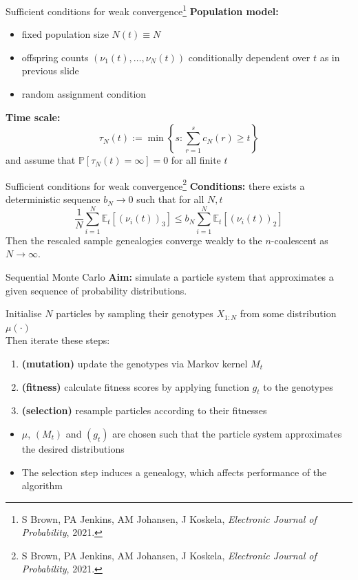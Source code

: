 \documentclass[aspectratio=169,fleqn]{beamer}
\theoremstyle{definition}
\newcommand{\Prob}{\mathbb{P}}
\newcommand{\Et}{\mathbb{E}_{t}}
\begin{document}
\begin{frame}{Sufficient conditions for weak convergence\footnote[frame]{S Brown, PA Jenkins, AM Johansen, J Koskela, \textit{Electronic Journal of Probability}, 2021.}}
	\textbf{Population model:}
	\begin{itemize}
		\item fixed population size $N(t) \equiv N$
		\item offspring counts $(\nu_1(t), \dots, \nu_N(t))$ conditionally dependent over $t$ as in previous slide
		\item random assignment condition
	\end{itemize}
	\textbf{Time scale:}
	\begin{equation*}
	\tau_N(t) := \min \left\{ s: \sum_{r=1}^s c_N(r) \geq t \right\}
	\end{equation*}
	and assume that $\Prob[\tau_N(t) = \infty] =0$ for all finite $t$ 
\end{frame}
\addtocounter{footnote}{-1}
\begin{frame}{Sufficient conditions for weak convergence\footnote[frame]{S Brown, PA Jenkins, AM Johansen, J Koskela, \textit{Electronic Journal of Probability}, 2021.}}
	\textbf{Conditions:} there exists a deterministic sequence $b_N \to 0$ such that for all $N,t$
	\begin{equation*}
	\frac{1}{N} \sum_{i=1}^N \Et[ (\nu_i(t))_3 ] \leq b_N  \sum_{i=1}^N \Et[ (\nu_i(t))_2 ]
	\end{equation*}
	Then the rescaled sample genealogies converge weakly to the $n$-coalescent as $N\to\infty$.
\end{frame}


\begin{frame}{Sequential Monte Carlo}
	\textbf{Aim:} simulate a particle system that approximates a given sequence of probability distributions.\\
	\vspace{10pt}
	
	Initialise $N$ particles by sampling their genotypes $X_{1:N}$ from some distribution $\mu(\cdot)$\\[5pt]
	
	Then iterate these steps:
	\begin{enumerate}
	\item \textbf{(mutation)} update the genotypes via Markov kernel $M_t$
	\item \textbf{(fitness)} calculate fitness scores by applying function $g_t$ to the genotypes
	\item \textbf{(selection)} resample particles according to their fitnesses
	\end{enumerate}
	\vspace{10pt}
	
	\begin{itemize}
	\item $\mu$, $(M_t)$ and $(g_t)$ are chosen such that the particle system approximates the desired distributions
	\item The selection step induces a genealogy, which affects performance of the algorithm
	\end{itemize}
\end{frame}
\end{document}

